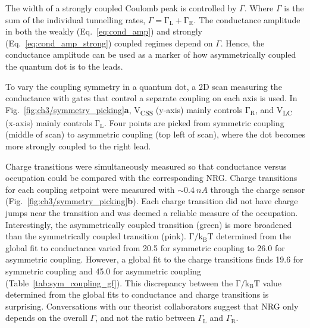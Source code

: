 The width of a strongly coupled Coulomb peak is controlled by $\Gamma$. Where $\Gamma$ is the sum of the individual tunnelling rates, $\Gamma=\mathrm{\Gamma_L} + \mathrm{\Gamma_R}$. 
The conductance amplitude in both the weakly (Eq.~\ref{eq:cond_amp}) and strongly (Eq.~\ref{eq:cond_amp_strong}) coupled regimes depend on $\Gamma$. Hence, the conductance amplitude can be used as a marker of how asymmetrically coupled the quantum dot is to the leads. 


To vary the coupling symmetry in a quantum dot, a 2D scan measuring the conductance with gates that control a separate coupling on each axis is used. In Fig.~\ref{fig:ch3/symmetry_picking}\textbf{a}, V\textsubscript{CSS} (y-axis) mainly controls $\mathrm{\Gamma_R}$, and V\textsubscript{LC} (x-axis) mainly controls $\mathrm{\Gamma_L}$. Four points are picked from symmetric coupling (middle of scan) to asymmetric coupling (top left of scan), where the dot becomes more strongly coupled to the right lead. 




Charge transitions were simultaneously measured so that conductance versus occupation could be compared with the corresponding NRG. 
Charge transitions for each coupling setpoint were measured with $\sim\qty{0.4}{nA}$ through the charge sensor (Fig.~\ref{fig:ch3/symmetry_picking}\textbf{b}). 
Each charge transition did not have charge jumps near the transition and was deemed a reliable measure of the occupation. Interestingly, the asymmetrically coupled transition (green) is more broadened than the symmetrically coupled transition (pink). $\mathrm{\Gamma/k_BT}$ determined from the global fit to conductance varied from 20.5 for symmetric coupling to 26.0 for asymmetric coupling. However, a global fit to the charge transitions finds 19.6 for symmetric coupling and 45.0 for asymmetric coupling (Table~\ref{tab:sym_coupling_gf}). This discrepancy between the $\mathrm{\Gamma/k_BT}$ value determined from the global fits to conductance and charge transitions is surprising. Conversations with our theorist collaborators suggest that NRG only depends on the overall $\Gamma$, and not the ratio between $\Gamma_\mathrm{L}$ and $\Gamma_\mathrm{R}$.

